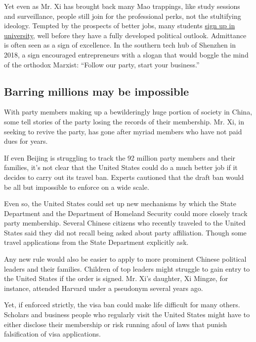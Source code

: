 Yet even as Mr. Xi has brought back many Mao trappings, like study
sessions and surveillance, people still join for the professional perks,
not the stultifying ideology. Tempted by the prospects of better jobs,
many students
\href{https://supchina.com/2019/07/31/communism-is-a-faith/}{sign up in
university}, well before they have a fully developed political outlook.
Admittance is often seen as a sign of excellence. In the southern tech
hub of Shenzhen in 2018, a sign encouraged entrepreneurs with a slogan
that would boggle the mind of the orthodox Marxist: ``Follow our party,
start your business.''

\hypertarget{barring-millions-may-be-impossible}{%
\subsection{Barring millions may be
impossible}\label{barring-millions-may-be-impossible}}

With party members making up a bewilderingly huge portion of society in
China, some tell stories of the party losing the records of their
membership. Mr. Xi, in seeking to revive the party, has gone after
myriad members who have not paid dues for years.

If even Beijing is struggling to track the 92 million party members and
their families, it's not clear that the United States could do a much
better job if it decides to carry out its travel ban. Experts cautioned
that the draft ban would be all but impossible to enforce on a wide
scale.

Even so, the United States could set up new mechanisms by which the
State Department and the Department of Homeland Security could more
closely track party membership. Several Chinese citizens who recently
traveled to the United States said they did not recall being asked about
party affiliation. Though some travel applications from the State
Department explicitly ask.

Any new rule would also be easier to apply to more prominent Chinese
political leaders and their families. Children of top leaders might
struggle to gain entry to the United States if the order is signed. Mr.
Xi's daughter, Xi Mingze, for instance, attended Harvard under a
pseudonym several years ago.

Yet, if enforced strictly, the visa ban could make life difficult for
many others. Scholars and business people who regularly visit the United
States might have to either disclose their membership or risk running
afoul of laws that punish falsification of visa applications.

